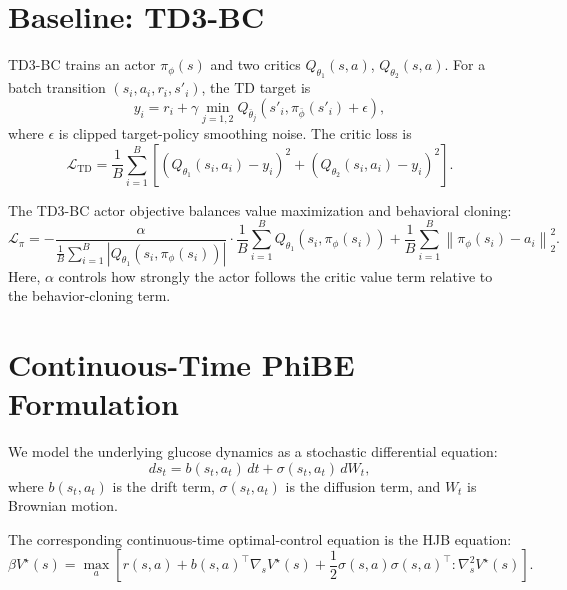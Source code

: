 \documentclass[11pt]{article}
\begin{document}
\section{Baseline: TD3-BC}

TD3-BC trains an actor \(\pi_\phi(s)\) and two critics \(Q_{\theta_1}(s,a)\),
\(Q_{\theta_2}(s,a)\). For a batch transition
\((s_i,a_i,r_i,s'_i)\), the TD target is
\begin{equation}
y_i
= r_i
+ \gamma
\min_{j=1,2}
Q_{\bar{\theta}_j}
\left(
s'_i,
\pi_{\bar{\phi}}(s'_i) + \epsilon
\right),
\end{equation}
where \(\epsilon\) is clipped target-policy smoothing noise. The critic loss is
\begin{equation}
\mathcal{L}_{\mathrm{TD}}
=
\frac{1}{B}
\sum_{i=1}^{B}
\left[
\left(Q_{\theta_1}(s_i,a_i)-y_i\right)^2
+
\left(Q_{\theta_2}(s_i,a_i)-y_i\right)^2
\right].
\end{equation}

The TD3-BC actor objective balances value maximization and behavioral cloning:
\begin{equation}
\mathcal{L}_{\pi}
=
-
\frac{\alpha}
{\frac{1}{B}\sum_{i=1}^{B}\left|Q_{\theta_1}(s_i,\pi_\phi(s_i))\right|}
\cdot
\frac{1}{B}\sum_{i=1}^{B} Q_{\theta_1}(s_i,\pi_\phi(s_i))
+
\frac{1}{B}\sum_{i=1}^{B}
\left\|\pi_\phi(s_i)-a_i\right\|_2^2.
\end{equation}
Here, \(\alpha\) controls how strongly the actor follows the critic value term relative
to the behavior-cloning term.

\section{Continuous-Time PhiBE Formulation}

We model the underlying glucose dynamics as a stochastic differential equation:
\begin{equation}
d s_t
= b(s_t,a_t)\,dt
+ \sigma(s_t,a_t)\,dW_t,
\end{equation}
where \(b(s_t,a_t)\) is the drift term, \(\sigma(s_t,a_t)\) is the diffusion term, and
\(W_t\) is Brownian motion.

The corresponding continuous-time optimal-control equation is the HJB equation:
\begin{equation}
\beta V^\star(s)
=
\max_a
\left[
r(s,a)
+
b(s,a)^\top \nabla_s V^\star(s)
+
\frac{1}{2}
\sigma(s,a)\sigma(s,a)^\top
:
\nabla_s^2 V^\star(s)
\right].
\end{equation}
\end{document}
